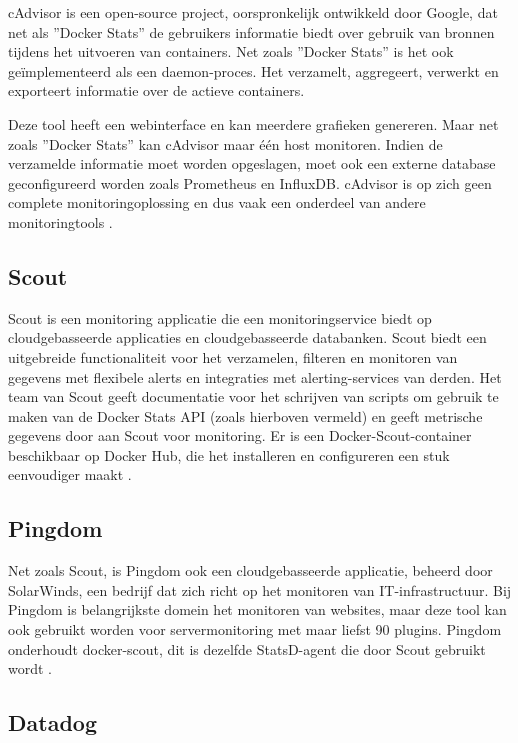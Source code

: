 cAdvisor is een open-source project, oorspronkelijk ontwikkeld door Google, dat net als ''Docker Stats'' de gebruikers informatie biedt over gebruik van bronnen tijdens het uitvoeren van containers. Net zoals ''Docker Stats'' is het ook geïmplementeerd als een daemon-proces. Het verzamelt, aggregeert, verwerkt en exporteert informatie over de actieve containers.

Deze tool heeft een webinterface en kan meerdere grafieken genereren. Maar net zoals ''Docker Stats'' kan cAdvisor maar één host monitoren. Indien de verzamelde informatie moet worden opgeslagen, moet ook een externe database geconfigureerd worden zoals Prometheus en InfluxDB. cAdvisor is op zich geen complete monitoringoplossing en dus vaak een onderdeel van andere monitoringtools \autocite{Sissons2021}.

\subsection{Scout}

Scout is een monitoring applicatie die een monitoringservice biedt op cloudgebasseerde applicaties en cloudgebasseerde databanken. Scout biedt een uitgebreide functionaliteit voor het verzamelen, filteren en monitoren van gegevens met flexibele alerts en integraties met alerting-services van derden. Het team van Scout geeft documentatie voor het schrijven van scripts om gebruik te maken van de Docker Stats API (zoals hierboven vermeld) en geeft metrische gegevens door aan Scout voor monitoring. Er is een Docker-Scout-container beschikbaar op Docker Hub, die het installeren en configureren een stuk eenvoudiger maakt \autocite{Sissons2021}.

\subsection{Pingdom}

Net zoals Scout, is Pingdom ook een cloudgebasseerde applicatie, beheerd door SolarWinds, een bedrijf dat zich richt op het monitoren van IT-infrastructuur. Bij Pingdom is belangrijkste domein het monitoren van websites, maar deze tool kan ook gebruikt worden voor servermonitoring met maar liefst 90 plugins. Pingdom onderhoudt docker-scout, dit is dezelfde StatsD-agent die door Scout gebruikt wordt \autocite{Sissons2021}.

\subsection{Datadog}


